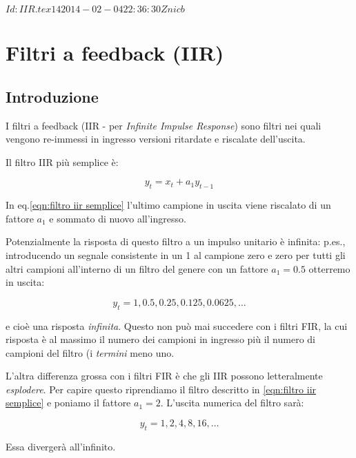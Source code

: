 %
%

\svnInfo $Id: IIR.tex 14 2014-02-04 22:36:30Z nicb $

\chapter{Filtri a feedback (IIR)\label{chap:iir}}

\section{Introduzione}

I filtri a feedback (IIR - per \emph{Infinite Impulse Response}) sono filtri nei quali vengono re-immessi in ingresso
versioni ritardate e riscalate dell'uscita.

Il filtro IIR pi\`u semplice \`e:

  \begin{equation}\label{eqn:filtro iir semplice}
		y_t = x_t + a_1 y_{t-1}
	\end{equation}

	In eq.\ref{eqn:filtro iir semplice} l'ultimo campione in uscita viene
	riscalato di un fattore $a_1$ e sommato di nuovo all'ingresso.

Potenzialmente la risposta di questo filtro a un impulso unitario \`e
infinita: p.es., introducendo un segnale consistente in un 1 al campione zero e zero
per tutti gli altri campioni all'interno di un filtro del genere con un
fattore $a_1 = 0.5$ otterremo in uscita:

  \begin{equation}
		y_t = 1, 0.5, 0.25, 0.125, 0.0625, \ldots
  \end{equation}

e cio\`e una risposta \emph{infinita}. Questo non pu\`o mai succedere con i
filtri FIR, la cui risposta \`e al massimo il numero dei campioni in ingresso
pi\`u il numero di campioni del filtro (i \emph{termini} meno uno.

L'altra differenza grossa con i filtri FIR \`e che gli IIR possono
letteralmente \emph{esplodere}. Per capire questo riprendiamo il filtro descritto in
\ref{eqn:filtro iir semplice} e poniamo il fattore $a_1 = 2$. L'uscita
numerica del
filtro sarà:

  \begin{equation}
		y_t = 1, 2, 4, 8, 16, \ldots
  \end{equation}

Essa diverger\`a all'infinito.

